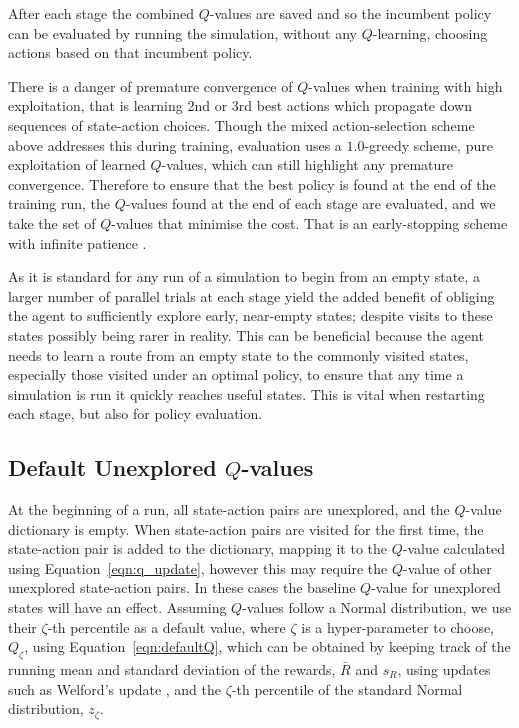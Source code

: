 \documentclass{article}
\begin{document}
After each stage the combined $Q$-values are saved and so the incumbent policy
can be evaluated by running the simulation, without any $Q$-learning, choosing
actions based on that incumbent policy.

There is a danger of premature convergence of $Q$-values when training with high
exploitation, that is learning 2nd or 3rd best actions which propagate down
sequences of state-action choices.
Though the mixed action-selection scheme above addresses this during training,
evaluation uses a $1.0$-greedy scheme, pure exploitation of learned $Q$-values,
which can still highlight any premature convergence.
Therefore to ensure that the best policy is found at the end of the training
run, the $Q$-values found at the end of each stage are evaluated, and we take
the set of $Q$-values that minimise the cost.
That is an early-stopping scheme with infinite patience \cite{goodfellow16}.

As it is standard for any run of a simulation to begin from an empty state, a
larger number of parallel trials at each stage yield the added benefit of
obliging the agent to sufficiently explore early, near-empty states; despite
visits to these states possibly being rarer in reality.
This can be beneficial because the agent needs to learn a route from an empty
state to the commonly visited states, especially those visited under an optimal
policy, to ensure that any time a simulation is run it quickly reaches useful
states.
This is vital when restarting each stage, but also for policy evaluation.


\subsection{Default Unexplored $Q$-values}\label{sec:default_unexplored}
At the beginning of a run, all state-action pairs are unexplored, and the
$Q$-value dictionary is empty.
When state-action pairs are visited for the first time, the state-action pair is
added to the dictionary, mapping it to the $Q$-value calculated using
Equation~\ref{eqn:q_update}, however this may require the $Q$-value of other
unexplored state-action pairs.
In these cases the baseline $Q$-value for unexplored states will have an effect.
Assuming $Q$-values follow a Normal distribution, we use their $\zeta$-th
percentile as a default value, where $\zeta$ is a hyper-parameter to choose,
$Q_{\zeta}$, using Equation~\ref{eqn:defaultQ}, which can be obtained by keeping
track of the running mean and standard deviation of the rewards, $\bar{R}$ and
$s_R$, using updates such as Welford's update \cite{welford62}, and the
$\zeta$-th percentile of the standard Normal distribution, $z_{\zeta}$.
\end{document}
